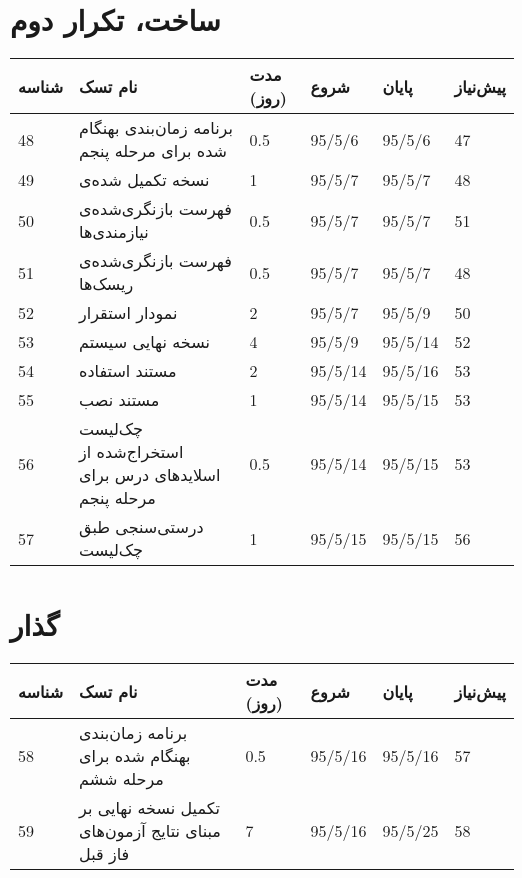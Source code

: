 \section{ساخت، تکرار دوم}
\begin{tabular}[H]{ | l | l | l | l | l | l | }
	\hline
	شناسه & نام تسک & مدت (روز) & شروع & پایان & پیش‌نیاز    \\ \hline
	48 & برنامه زمان‌بندی بهنگام شده برای مرحله پنجم & 0.5   &   95/5/6 &   95/5/6 & 47    \\ \hline
	49 & نسخه تکمیل شده‌ی \lr{Usecase Realizations} & 1   &   95/5/7 &   95/5/7 & 48    \\ \hline
	50 &  فهرست بازنگری‌شده‌ی نیازمندی‌ها & 0.5   &   95/5/7 &   95/5/7 & 51    \\ \hline
	51 &  فهرست بازنگری‌شده‌ی ریسک‌ها & 0.5   &   95/5/7 &   95/5/7 & 48    \\ \hline
	52 & نمودار استقرار & 2   &   95/5/7 &   95/5/9 & 50    \\ \hline
	53 & نسخه نهایی سیستم & 4   &   95/5/9 &   95/5/14 & 52    \\ \hline
	54 & مستند استفاده & 2   &   95/5/14 &   95/5/16 & 53    \\ \hline
	55 & مستند نصب & 1   &   95/5/14 &   95/5/15 & 53    \\ \hline
	56 & چک‌لیست استخراج‌شده از اسلایدهای درس برای مرحله پنجم & 0.5   &   95/5/14 &   95/5/15 & 53    \\ \hline
	57 & درستی‌سنجی طبق  چک‌لیست  & 1   &   95/5/15 &   95/5/15 & 56    \\ \hline
\end{tabular}

\section{گذار}
\begin{tabular}[H]{ | l | l | l | l | l | l | }
	\hline
	شناسه & نام تسک & مدت (روز) & شروع & پایان & پیش‌نیاز    \\ \hline
	58 & برنامه زمان‌بندی بهنگام شده برای مرحله ششم & 0.5   &   95/5/16 &   95/5/16 & 57    \\ \hline
	59 & تکمیل نسخه نهایی بر مبنای نتایج آزمون‌های فاز قبل & 7   &   95/5/16 &   95/5/25 & 58    \\ \hline
	
\end{tabular}
\restoregeometry